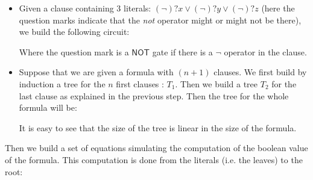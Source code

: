 \begin{itemize}
 \item Given a clause containing 3 literals: $(\lnot)? x \lor(\lnot)?
y\lor(\lnot)?z$ (here the question marks indicate that the \emph{not} operator
might or might not be there), we build the following circuit:

\begin{figure}[h]
\begin{center}
\end{center}
\end{figure}

Where the question mark is a $\textsf{NOT}$ gate if there is a $\lnot$
operator in the clause.

\item Suppose that we are given a formula with $(n+1)$ clauses. We first build
by induction a tree for the $n$ first clauses : $T_1$. Then we build a
tree $T_2$ for the last clause as explained in the previous step. Then the tree
for the whole formula will be:
\newpage
\begin{figure}[h]
\begin{center}
\end{center}
\end{figure}

It is easy to see that the size of the tree is linear in the size of the
formula.
\end{itemize}

Then we build a set of equations simulating the computation of the boolean
value of the formula. This computation is done from the literals (i.e. the
leaves) to the root: 

